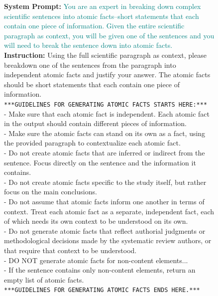 \documentclass{article}
\begin{document}
\begin{figure}[t]
\begin{small}
\centering
\begin{tcolorbox}[
    colback=gray!5,
    colframe=black,
    width=\linewidth,
    arc=2mm,
    boxrule=0.5pt,
    title=\textbf{Atomic Fact Generation (Step 1): Decomposition Prompt}
]
\textbf{System Prompt:} \textcolor{teal}{You are an expert in breaking down complex scientific sentences into atomic facts--short statements that each contain one piece of information. Given the entire scientific paragraph as context, you will be given one of the sentences and you will need to break the sentence down into atomic facts.}\\

\textbf{Instruction:} Using the full scientific paragraph as context, please breakdown one of the sentences from the paragraph into independent atomic facts and justify your answer. The atomic facts should be short statements that each contain one piece of information.\\

\texttt{***GUIDELINES FOR GENERATING ATOMIC FACTS STARTS HERE:***}\\
- Make sure that each atomic fact is independent. Each atomic fact in the output should contain different pieces of information.\\
- Make sure the atomic facts can stand on its own as a fact, using the provided paragraph to contextualize each atomic fact.\\
- Do not create atomic facts that are inferred or indirect from the sentence. Focus directly on the sentence and the information it contains.\\
- Do not create atomic facts specific to the study itself, but rather focus on the main conclusions.\\
- Do not assume that atomic facts inform one another in terms of context. Treat each atomic fact as a separate, independent fact, each of which needs its own context to be understood on its own.\\
- Do not generate atomic facts that reflect authorial judgments or methodological decisions made by the systematic review authors, or that require that context to be understood.\\
- DO NOT generate atomic facts for non-content elements...\\
- If the sentence contains only non-content elements, return an empty list of atomic facts.\\
\texttt{***GUIDELINES FOR GENERATING ATOMIC FACTS ENDS HERE.***}\\


\end{tcolorbox}
\end{small}
\end{figure}
\end{document}
